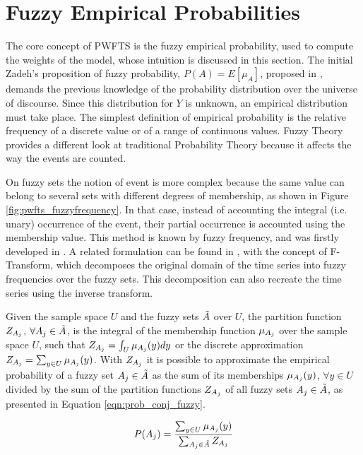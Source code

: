 \section{Fuzzy Empirical Probabilities}
\label{sec:pwfts_empiricalprob}

The core concept of PWFTS is the fuzzy empirical probability, used to compute the weights of the model, whose intuition is discussed in this section. The initial Zadeh's proposition of fuzzy probability, $P(A) = E[\mu_A]$, proposed in \cite{Zadeh1968}, demands the previous knowledge of the probability distribution over the universe of discourse. Since this distribution for $Y$ is unknown, an empirical distribution must take place. The simplest definition of empirical probability is the relative frequency of a discrete value or of a range of continuous values. Fuzzy Theory provides a different look at traditional Probability Theory because it affects the way the events are counted. 

On fuzzy sets the notion of event is more complex because the same value can belong to several sets with different degrees of membership, as shown in Figure \ref{fig:pwfts_fuzzyfrequency}. In that case, instead of accounting the integral (i.e. unary) occurrence of the event, their partial occurrence is accounted using the membership value. This method is known by fuzzy frequency, and was firstly  developed in \cite{Luo2000}. A related formulation can be found in \cite{Perfilieva2006}, with the concept of F-Transform, which decomposes the original domain of the time series into fuzzy frequencies over the fuzzy sets. This decomposition can also recreate the time series using the inverse transform. 

Given the sample space $U$ and the fuzzy sets $\tilde{A}$ over $U$, the partition function $Z_{A_j}$, $\forall A_j \in \tilde{A}$, is the integral of the membership function $\mu_{A_j}$ over the sample space $U$, such that $Z_{A_j} = \int_U \mu_{A_j}(y) dy$ or the discrete approximation $Z_{A_j} = \sum_{y \in U} \mu_{A_j}(y)$. With $Z_{A_j}$ it is possible to approximate the empirical probability of a fuzzy set $A_j \in \tilde{A}$ as the sum of its memberships $\mu_{A_j}(y)$, $\forall y \in U$ divided by the sum of the partition functions $Z_{A_j}$ of all fuzzy sets $A_j \in \tilde{A}$, as presented in Equation \eqref{eqn:prob_conj_fuzzy}. 

\begin{equation}
P(A_j) = \frac{\sum_{y \in U} \mu_{A_j}(y)}{\sum_{A_j \in \tilde{A}}Z_{A_j}} 
\label{eqn:prob_conj_fuzzy}
\end{equation}

